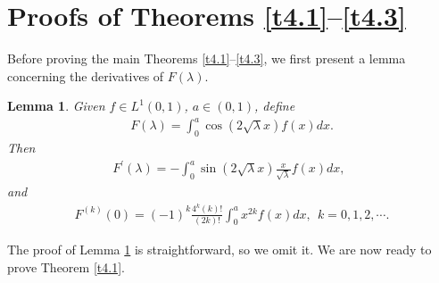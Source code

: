 \documentclass[reqno,12pt,centertags]{amsart}
\numberwithin{equation}{section}
\newtheorem{lemma}[theorem]{Lemma}
\theoremstyle{definition}
\begin{document}
\section{Proofs of Theorems \ref{t4.1}--\ref{t4.3}}\label{s4}



Before proving the main Theorems \ref{t4.1}--\ref{t4.3}, we first present a lemma concerning the derivatives of $F(\lambda)$.

\begin{lemma}\label{l4.4}
Given $f \in L^1(0,1)$, $a \in(0,1)$, define
\begin{align*}
F(\lambda)=\int_{0}^{a}\cos(2\sqrt{\lambda}x)f(x)dx.
\end{align*}
Then
\begin{align*}
F^{\prime}(\lambda)=-\int_{0}^{a} \sin(2\sqrt{\lambda} x) \frac{x}{\sqrt{\lambda}}f(x)dx,~~
\end{align*}
and 
\begin{align*}
F^{(k)}(0)=(-1)^k \frac{4^k(k)!}{(2k)!}
\int_{0}^{a}x^{2k}f(x)dx, 
~~k=0,1,2, \cdots.
\end{align*}
\end{lemma}

The proof of Lemma \ref{l4.4} is straightforward, so we omit it. We are now ready to prove Theorem \ref{t4.1}.
\end{document}
